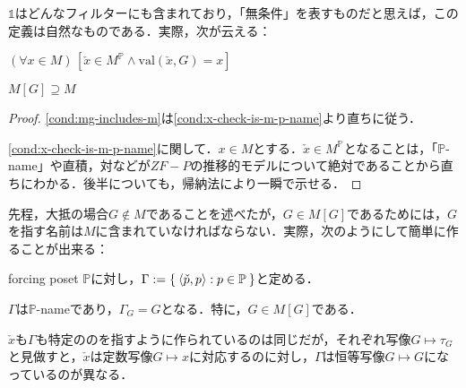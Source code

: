 \documentclass[a4j]{bxjsarticle}
\newcommand{\val}{\mathrm{val}}
\begin{document}
$\mathds{1}$はどんなフィルターにも含まれており，「無条件」を表すものだと思えば，この定義は自然なものである．実際，次が云える：
\begin{lemma}
 \begin{enumerate*}[label=(\arabic*),itemjoin=\quad]
  \item $(\forall x \in M)\, \left[ \check{x} \in M^\mathbb{P} \wedge \val(\check{x}, G) = x\right]$\label{cond:x-check-is-m-p-name}
  \item $M[G] \supseteq M$\label{cond:mg-includes-m}
 \end{enumerate*}
\end{lemma}
\begin{proof}
 \ref{cond:mg-includes-m}は\ref{cond:x-check-is-m-p-name}より直ちに従う．

 \ref{cond:x-check-is-m-p-name}に関して．$x \in M$とする．$\check{x} \in M^\mathbb{P}$となることは，「$\mathbb{P}$-name」や直積，対などが$ZF-P$の推移的モデルについて絶対であることから直ちにわかる．後半についても，帰納法により一瞬で示せる．\mbox{}
\end{proof}

先程，大抵の場合$G \notin M$であることを述べたが，$G \in M[G]$であるためには，$G$を指す名前は$M$に含まれていなければならない．実際，次のようにして簡単に作ることが出来る：
\begin{definition}
 forcing poset $\mathbb{P}$に対し，$\Gamma \mathrel{:=} \Set{ \braket{\check{p}, p} : p \in \mathbb{P}}$と定める．
\end{definition}
\begin{lemma}
 $\Gamma$は$\mathbb{P}$-nameであり，$\Gamma_G = G$となる．特に，$G \in M[G]$である．
\end{lemma}

$\check{x}$も$\Gamma$も特定ののを指すように作られているのは同じだが，それぞれ写像$G \mapsto \tau_G$と見做すと，$\check{x}$は定数写像$G \mapsto x$に対応するのに対し，$\Gamma$は恒等写像$G \mapsto G$になっているのが異なる．
\end{document}
